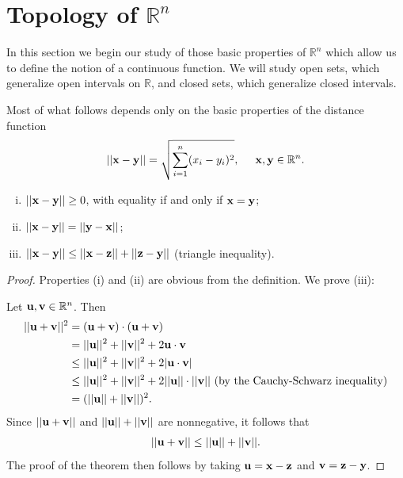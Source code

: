 \documentclass[12pt,letterpaper,reqno]{article}
\numberwithin{equation}{section}
\newcommand{\R}{\ensuremath{\mathbb R}}
\newcommand{\bu}{{\bf u}}
\newcommand{\bv}{{\bf v}}
\newcommand{\bx}{{\bf x}}
\newcommand{\by}{{\bf y}}
\newcommand{\bz}{{\bf z}}
\begin{document}
{\section{Topology of $\R^n$}\label{app:topology}
In this section we begin our study of those basic properties of $\R^n$ which allow us to define the notion of a continuous function. We will study open sets, which generalize open intervals on $\R$, and closed sets, which generalize closed intervals.

Most of what follows depends only on the basic properties of the distance function
\begin{align*}
	||\bx-\by||=\sqrt{\sum_{i=1}^n(x_i-y_i)^2}, \hspace{0.5cm} \bx, \by \in \R^n.
\end{align*}

\begin{thm}
	\begin{enumerate}[(i)]\hspace{15cm}
		\item $||\bx-\by||\geq 0$, with equality if and only if $\bx=\by$;
		\item $||\bx-\by||=||\by-\bx||$;
		\item $||\bx-\by||\leq ||\bx-\bz||+||\bz-\by||$ (triangle inequality).
	\end{enumerate}
\end{thm}

\begin{proof}
Properties (i) and (ii) are obvious from the definition. We prove (iii):

Let $\bu, \bv \in \R^n$. Then
\begin{align*}
	||\bu+\bv||^2&=(\bu+\bv)\cdot (\bu+\bv) \\
	&=||\bu||^2+||\bv||^2+2\bu \cdot \bv \\
	&\leq ||\bu||^2+||\bv||^2+2|\bu \cdot \bv| \\
	&\leq ||\bu||^2+||\bv||^2+2||\bu|| \cdot ||\bv|| \text{ (by the Cauchy-Schwarz inequality)} \\
	&=(||\bu||+||\bv||)^2.
\end{align*}	
Since $||\bu+\bv||$ and $||\bu||+||\bv||$ are nonnegative, it follows that
\begin{align*}
	||\bu+\bv|| \leq ||\bu||+||\bv||.
\end{align*}
The proof of the theorem then follows by taking $\bu=\bx-\bz$ and $\bv=\bz-\by$.
\end{proof}

}
\end{document}
